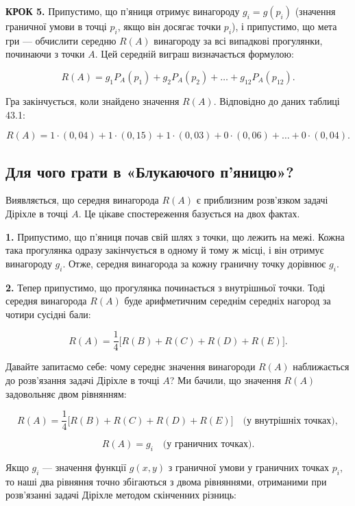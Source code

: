 \documentclass[
  ukrainian,
]{article}
\begin{document}
\textbf{КРОК 5.} Припустимо, що п'яниця отримує винагороду
\(g_i = g(p_i)\) (значення граничної умови в точці \(p_i\), якщо він
досягає точки \(p_i\)), і припустимо, що мета гри --- обчислити середню
\(R(A)\) винагороду за всі випадкові прогулянки, починаючи з точки
\(A\). Цей середній виграш визначається формулою:

\[R(A) = g_1 P_A(p_1) + g_2 P_A(p_2) + \dots + g_{12} P_A(p_{12}).\]

Гра закінчується, коли знайдено значення \(R(A)\). Відповідно до даних
таблиці 43.1:

\[R(A) = 1\cdot(0{,}04) + 1\cdot(0{,}15) + 1\cdot(0{,}03) + 0\cdot(0{,}06) + \dots + 0\cdot(0{,}04).\]

\subsection{Для чого грати в «Блукаючого
п'яницю»?}\label{ux434ux43bux44f-ux447ux43eux433ux43e-ux433ux440ux430ux442ux438-ux432-ux431ux43bux443ux43aux430ux44eux447ux43eux433ux43e-ux43fux44fux43dux438ux446ux44e}

Виявляється, що середня винагорода \(R(A)\) є приблизним розв'язком
задачі Діріхле в точці \(A\). Це цікаве спостереження базується на двох
фактах.

\textbf{1.} Припустимо, що п'яниця почав свій шлях з точки, що лежить на
межі. Кожна така прогулянка одразу закінчується в одному й тому ж місці,
і він отримує винагороду \(g_i\). Отже, середня винагорода за кожну
граничну точку дорівнює \(g_i\).

\textbf{2.} Тепер припустимо, що прогулянка починається з внутрішньої
точки. Тоді середня винагорода \(R(A)\) буде арифметичним середнім
середніх нагород за чотири сусідні бали:

\[R(A) = \frac{1}{4}\bigl[R(B) + R(C) + R(D) + R(E)\bigr].\]

Давайте запитаємо себе: чому середнє значення винагороди \(R(A)\)
наближається до розв'язання задачі Діріхле в точці \(A\)? Ми бачили, що
значення \(R(A)\) задовольняє двом рівнянням:

\[R(A) = \frac{1}{4}\bigl[R(B) + R(C) + R(D) + R(E)\bigr] \quad \text{(у внутрішніх точках)},\]

\[R(A) = g_i \quad \text{(у граничних точках)}.\]

Якщо \(g_i\) --- значення функції \(g(x, y)\) з граничної умови у
граничних точках \(p_i\), то наші два рівняння точно збігаються з двома
рівняннями, отриманими при розв'язанні задачі Діріхле методом скінченних
різниць:
\end{document}
